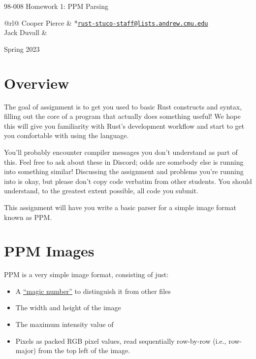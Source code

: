 \documentclass{article}
\newcommand{\longsemester}{Spring 2023}
\newcommand{\deptcode}{98}
\newcommand{\coursecode}{008}
\newcommand{\fullcoursecode}{\deptcode-\coursecode}
\begin{document}
\thispagestyle{empty}
\begin{center}
    \begin{minipage}{.85\textwidth}
        \centering
        {\huge {\fullcoursecode} Homework 1: PPM Parsing}

        \vspace{1em}

        \begin{tabular}{@{}rl@{}}
            Cooper Pierce & *{\href{mailto:rust-stuco-staff@lists.andrew.cmu.edu}{\texttt{rust-stuco-staff@lists.andrew.cmu.edu}}} \\
            Jack Duvall &                                                                         \\
            
        \end{tabular}

        \vspace{1em}

        \longsemester
    \end{minipage}
\end{center}


\section*{Overview}

The goal of assignment is to get you used to basic Rust constructs and syntax, filling out the core of a program that actually does something useful! We hope this will give you familiarity with Rust's development workflow and start to get you comfortable with using the language.

You'll probably encounter compiler messages you don't understand as part of this. Feel free to ask about these in Discord; odds are somebody else is running into something similar! Discussing the assignment and problems you're running into is okay, but please don't copy code verbatim from other students. You should understand, to the greatest extent possible, all code you submit.

This assignment will have you write a basic parser for a simple image format known as PPM.

\section*{PPM Images}
PPM is a very simple image format, consisting of just:
\begin{itemize}
    \item A \href{https://en.wikipedia.org/wiki/List_of_file_signatures}{``magic number''} to distinguish it from other files
    \item The width and height of the image
    \item The maximum intensity value of
    \item Pixels as packed RGB pixel values, read sequentially row-by-row
          (i.e., row-major) from the top left of the image.
\end{itemize}
\end{document}
